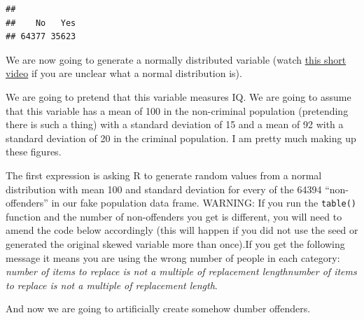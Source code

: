 \documentclass[
]{book}
\newenvironment{Shaded}{\begin{snugshade}}{\end{snugshade}}
\newcommand{\AttributeTok}[1]{\textcolor[rgb]{0.77,0.63,0.00}{#1}}
\newcommand{\DecValTok}[1]{\textcolor[rgb]{0.00,0.00,0.81}{#1}}
\newcommand{\FunctionTok}[1]{\textcolor[rgb]{0.00,0.00,0.00}{#1}}
\newcommand{\NormalTok}[1]{#1}
\newcommand{\OtherTok}[1]{\textcolor[rgb]{0.56,0.35,0.01}{#1}}
\newcommand{\SpecialCharTok}[1]{\textcolor[rgb]{0.00,0.00,0.00}{#1}}
\newcommand{\StringTok}[1]{\textcolor[rgb]{0.31,0.60,0.02}{#1}}
\begin{document}
\begin{verbatim}
## 
##    No   Yes 
## 64377 35623
\end{verbatim}

We are now going to generate a normally distributed variable (watch \href{https://www.youtube.com/watch?v=mtH1fmUVkfE}{this short video} if you are unclear what a normal distribution is).

We are going to pretend that this variable measures IQ. We are going to assume that this variable has a mean of 100 in the non-criminal population (pretending there is such a thing) with a standard deviation of 15 and a mean of 92 with a standard deviation of 20 in the criminal population. I am pretty much making up these figures.

The first expression is asking R to generate random values from a normal distribution with mean 100 and standard deviation for every of the 64394 ``non-offenders'' in our fake population data frame. WARNING: If you run the \texttt{table()} function and the number of non-offenders you get is different, you will need to amend the code below accordingly (this will happen if you did not use the seed or generated the original skewed variable more than once).If you get the following message it means you are using the wrong number of people in each category: \emph{number of items to replace is not a multiple of replacement lengthnumber of items to replace is not a multiple of replacement length}.

\begin{Shaded}
\end{Shaded}

And now we are going to artificially create somehow dumber offenders.

\begin{Shaded}
\end{Shaded}
\end{document}
